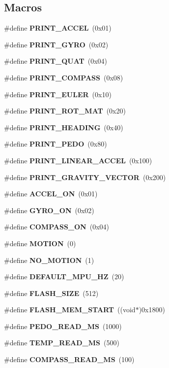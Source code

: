 \subsection*{Macros}
\begin{DoxyCompactItemize}
\item 
\#define \textbf{ P\+R\+I\+N\+T\+\_\+\+A\+C\+C\+EL}~(0x01)
\item 
\#define \textbf{ P\+R\+I\+N\+T\+\_\+\+G\+Y\+RO}~(0x02)
\item 
\#define \textbf{ P\+R\+I\+N\+T\+\_\+\+Q\+U\+AT}~(0x04)
\item 
\#define \textbf{ P\+R\+I\+N\+T\+\_\+\+C\+O\+M\+P\+A\+SS}~(0x08)
\item 
\#define \textbf{ P\+R\+I\+N\+T\+\_\+\+E\+U\+L\+ER}~(0x10)
\item 
\#define \textbf{ P\+R\+I\+N\+T\+\_\+\+R\+O\+T\+\_\+\+M\+AT}~(0x20)
\item 
\#define \textbf{ P\+R\+I\+N\+T\+\_\+\+H\+E\+A\+D\+I\+NG}~(0x40)
\item 
\#define \textbf{ P\+R\+I\+N\+T\+\_\+\+P\+E\+DO}~(0x80)
\item 
\#define \textbf{ P\+R\+I\+N\+T\+\_\+\+L\+I\+N\+E\+A\+R\+\_\+\+A\+C\+C\+EL}~(0x100)
\item 
\#define \textbf{ P\+R\+I\+N\+T\+\_\+\+G\+R\+A\+V\+I\+T\+Y\+\_\+\+V\+E\+C\+T\+OR}~(0x200)
\item 
\#define \textbf{ A\+C\+C\+E\+L\+\_\+\+ON}~(0x01)
\item 
\#define \textbf{ G\+Y\+R\+O\+\_\+\+ON}~(0x02)
\item 
\#define \textbf{ C\+O\+M\+P\+A\+S\+S\+\_\+\+ON}~(0x04)
\item 
\#define \textbf{ M\+O\+T\+I\+ON}~(0)
\item 
\#define \textbf{ N\+O\+\_\+\+M\+O\+T\+I\+ON}~(1)
\item 
\#define \textbf{ D\+E\+F\+A\+U\+L\+T\+\_\+\+M\+P\+U\+\_\+\+HZ}~(20)
\item 
\#define \textbf{ F\+L\+A\+S\+H\+\_\+\+S\+I\+ZE}~(512)
\item 
\#define \textbf{ F\+L\+A\+S\+H\+\_\+\+M\+E\+M\+\_\+\+S\+T\+A\+RT}~((void$\ast$)0x1800)
\item 
\#define \textbf{ P\+E\+D\+O\+\_\+\+R\+E\+A\+D\+\_\+\+MS}~(1000)
\item 
\#define \textbf{ T\+E\+M\+P\+\_\+\+R\+E\+A\+D\+\_\+\+MS}~(500)
\item 
\#define \textbf{ C\+O\+M\+P\+A\+S\+S\+\_\+\+R\+E\+A\+D\+\_\+\+MS}~(100)
\end{DoxyCompactItemize}
